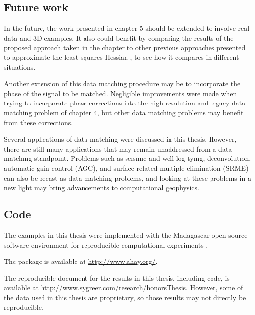 \subsection{Future work}
In the future, the work presented in chapter 5 should be extended to involve real data and 3D examples. 
It also could benefit by comparing the results of the proposed approach taken in the chapter to other previous approaches presented to approximate the least-squares Hessian \cite[]{migdec,lsamp,siklsm,pwlsrtm,diagamp,debfilt,prestack,poststack}, to see how it compares in different situations.

Another extension of this data matching procedure may be to incorporate
the phase of the signal to be matched. 
Negligible improvements were made when trying to incorporate phase corrections into the high-resolution and legacy data matching problem of chapter 4, but other data matching problems may benefit from these corrections.

Several applications of data matching were discussed in this thesis. 
However, there are still many applications that may remain unaddressed from a data matching standpoint. 
Problems such as seismic and well-log tying, deconvolution, automatic gain control (AGC), and surface-related multiple elimination (SRME) can also be recast as data matching problems, and looking at these problems in a new light may bring advancements to computational geophysics.

\subsection{Code}
The examples in this thesis were implemented with the Madagascar open-source software environment for reproducible computational experiments \cite[]{madagascar}.

The package is available at \url{http://www.ahay.org/}.

The reproducible document for the results in this thesis, including code, is available at \url{http://www.sygreer.com/research/honorsThesis}.
However, some of the data used in this thesis are proprietary, so those results may not directly be reproducible.
